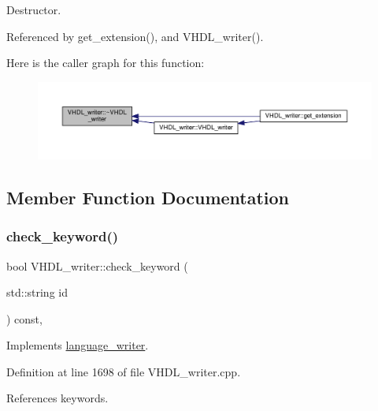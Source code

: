 Destructor. 



Referenced by get\+\_\+extension(), and V\+H\+D\+L\+\_\+writer().

Here is the caller graph for this function\+:
\nopagebreak
\begin{figure}[H]
\begin{center}
\leavevmode
\includegraphics[width=350pt]{d0/d0c/structVHDL__writer_afc4d892a2ca0e9def482be137208a7b5_icgraph}
\end{center}
\end{figure}


\subsection{Member Function Documentation}
\mbox{\label{structVHDL__writer_a5c9eb93fec5f11553f37873b107dd739}} 
\subsubsection{\texorpdfstring{check\+\_\+keyword()}{check\_keyword()}}
{\footnotesize\ttfamily bool V\+H\+D\+L\+\_\+writer\+::check\+\_\+keyword (\begin{DoxyParamCaption}\item[{std\+::string}]{id }\end{DoxyParamCaption}) const\hspace{0.3cm}{\ttfamily [override]}, {\ttfamily [virtual]}}



Implements \hyperlink{classlanguage__writer_a5a69f96be3c6c3cab69325058c077d21}{language\+\_\+writer}.



Definition at line 1698 of file V\+H\+D\+L\+\_\+writer.\+cpp.



References keywords.



